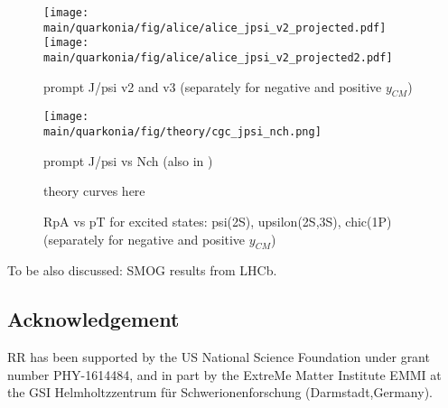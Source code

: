 \documentclass[../report.tex]{subfiles}
\providecommand{\main}{..}
\begin{document}
\begin{figure}
 \begin{center}
  \texttt{[image: \\main/quarkonia/fig/alice/alice\_jpsi\_v2\_projected.pdf]}
  \texttt{[image: \\main/quarkonia/fig/alice/alice\_jpsi\_v2\_projected2.pdf]}
 \end{center}

 \caption{prompt J/psi v2 and v3 (separately for negative and positive $y_{CM}$)}
\end{figure}

\begin{figure}
 \begin{center}
  \texttt{[image: \\main/quarkonia/fig/theory/cgc\_jpsi\_nch.png]}
 \end{center}

 \caption{prompt J/psi vs Nch (also in \pp)~\cite{Ma:2018bax}}
\end{figure}

\begin{figure}
 \begin{center}
 theory curves here
 \end{center}

 \caption{RpA vs pT for excited states: psi(2S), upsilon(2S,3S), chic(1P) (separately for negative and positive $y_{CM}$)}
\end{figure}

To be also discussed: SMOG results from LHCb.

\subsection*{Acknowledgement}
RR has been supported by the US National Science Foundation under
grant number PHY-1614484, and in part by the ExtreMe Matter Institute EMMI at 
the GSI Helmholtzzentrum f\"{u}r Schwerionenforschung (Darmstadt,Germany).
\end{document}
